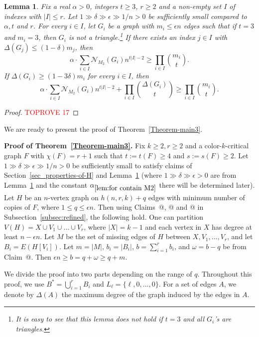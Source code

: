 \documentclass[10pt]{article}
\makeatletter
\newtheorem{lemma}[theorem]{Lemma}
\newcommand*{\rom}[1]{\expandafter\@slowromancap\romannumeral #1@}
\makeatother
\begin{document}
\begin{lemma}\label{lem:for contain M2}
Fix a real $\alpha>0$, integers $t\geq 3$, $r\geq 2$ and a non-empty set $I$ of indexes with $|I|\leq r$.
Let $1\gg\delta\gg\epsilon\gg 1/n>0$ be sufficiently small compared to $\alpha, t$ and $r$.
For every $i\in I$, let $G_i$ be a graph with $m_i\leq \epsilon n$ edges such that if $t=3$ and $m_i=3$, then $G_i$ is not a triangle.\footnote{It is easy to see that this lemma does not hold if $t=3$ and all $G_i$'s are triangles.}
If there exists an index $j\in I$ with $\Delta(G_j)\leq (1- \delta)m_j$,
then
$$
\alpha\cdot\sum_{i\in I}  \mathcal{N}_{M_2}(G_i)n^{t|I|-2}  \geq \prod_{i\in I}{m_i \choose t}.
$$
If $\Delta(G_i)\geq (1- 3\delta)m_i$ for every $i\in I$, then
$$
\alpha\cdot\sum_{i\in I}  \mathcal{N}_{M_2}(G_i)n^{t|I|-2} + \prod_{i\in I}{\Delta(G_i)\choose t}\geq \prod_{i\in I}{m_i \choose t}.
$$
\end{lemma}
\begin{proof}\textcolor{red}{TOPROVE 17}\end{proof}

We are ready to present the proof of Theorem~\ref{Theorem-main3}.

\medskip

{\noindent \bf Proof of Theorem~\ref{Theorem-main3}.}
Fix $k\geq 2, r\geq 2$ and a color-$k$-critical graph $F$ with $\chi(F)=r+1$ such that $t:=t(F)\geq 4$ and $s:=s(F)\geq 2$.
Let $1\gg\delta\gg \epsilon\gg 1/n>0$ be sufficiently small to satisfy claims of Section~\ref{sec_properties-of-H} and Lemma~\ref{lem:for contain M2} (where $1\gg\delta\gg \epsilon>0$ are from Lemma~\ref{lem:for contain M2} and the constant $\alpha_{\ref{lem:for contain M2}}$ there will be determined later).
Let $H$ be an $n$-vertex graph on $h(n,r,k)+q$ edges with minimum number of copies of $F$, where $1\leq q\leq \epsilon n$.
Then using Claims~\rom{1}, \rom{2} and \rom{3} in Subsection~\ref{subsec:refined}, the following hold.
One can partition $V(H)=X\cup V_1\cup \ldots \cup V_r$, where $|X|=k-1$ and each vertex in $X$ has degree at least $n-\epsilon n$.
Let $M$ be the set of missing edges of $H$ between $X, V_1,\ldots, V_r$, and let $B_i=E(H[V_i])$.
Let $m=|M|$, $b_i=|B_i|$, $b=\sum_{i=1}^{r}b_i$, and $\omega=b-q$ be from Claim~\rom{3}.
Then $\epsilon n\geq b=q+\omega\geq q+m$.

We divide the proof into two parts depending on the range of $q$.
Throughout this proof, we use $B^\ast=\bigcup_{i=1}^r B_i$ and $L_\ell=\{\ell,0,\ldots,0\}$.
For a set of edges $A$, we denote by $\Delta(A)$ the maximum degree of the graph induced by the edges in $A$.
\end{document}
